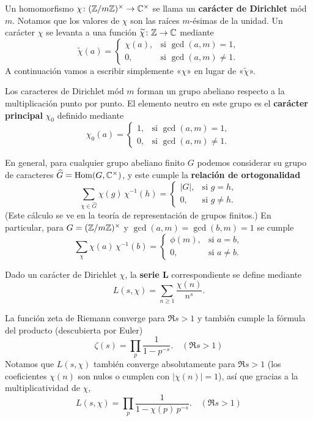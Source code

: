 Un homomorfismo $\chi\colon (\mathbb{Z}/m\mathbb{Z})^\times \to \mathbb{C}^\times$ se llama un
\textbf{carácter de Dirichlet} mód $m$. Notamos que los valores de $\chi$
son las raíces $m$-ésimas de la unidad. Un carácter $\chi$ se levanta a una
función $\widetilde{\chi}\colon \mathbb{Z} \to \mathbb{C}$ mediante
\[ \widetilde{\chi} (a) = \begin{cases}
  \chi (a), & \text{si }\gcd (a,m) = 1, \\
  0, & \text{si }\gcd (a,m) \ne 1.
\end{cases} \]
A continuación vamos a escribir simplemente «$\chi$» en lugar de
«$\widetilde{\chi}$».

Los caracteres de Dirichlet mód $m$ forman un grupo abeliano respecto a
la multiplicación punto por punto. El elemento neutro en este grupo es el
\textbf{carácter principal} $\chi_0$ definido mediante
\[ \chi_0 (a) = \begin{cases}
  1, & \text{si }\gcd (a,m) = 1,\\
  0, & \text{si }\gcd (a,m) \ne 1.
\end{cases} \]

En general, para cualquier grupo abeliano finito $G$ podemos considerar su grupo
de caracteres $\widehat{G} = \operatorname{Hom} (G, \mathbb{C}^\times)$, y este cumple la
\textbf{relación de ortogonalidad}
\[ \sum_{\chi \in \widehat{G}} \chi (g)\,\chi^{-1} (h) = \begin{cases}
    |G|, & \text{si }g = h,\\
    0, & \text{si }g \ne h.
\end{cases} \]
(Este cálculo se ve en la teoría de representación de grupos finitos.)
En particular, para $G = (\mathbb{Z}/m\mathbb{Z})^\times$ y $\gcd (a,m) = \gcd (b,m) = 1$ se
cumple
\begin{equation}
  \label{eqn:relacion-de-ortogonalidad}
  \sum_\chi \chi (a)\,\chi^{-1} (b) = \begin{cases}
    \phi (m), & \text{si }a = b,\\
    0, & \text{si }a \ne b.
  \end{cases}
\end{equation}

\begin{definicion}
  Dado un carácter de Dirichlet $\chi$, la \textbf{serie L} correspondiente
  se define mediante
  $$L (s,\chi) = \sum_{n\ge 1} \frac{\chi (n)}{n^s}.$$
\end{definicion}

La función zeta de Riemann converge para $\Re s > 1$ y también cumple la
fórmula del producto (descubierta por Euler)
$$\zeta (s) = \prod_p \frac{1}{1 - p^{-s}}. \quad (\Re s > 1)$$
Notamos que $L (s,\chi)$ también converge absolutamente para $\Re s > 1$
(los coeficientes $\chi (n)$ son nulos o cumplen con $|\chi (n)| = 1$),
así que gracias a la multiplicatividad de $\chi$,
$$L (s,\chi) = \prod_p \frac{1}{1 - \chi (p)\,p^{-s}}. \quad (\Re s > 1)$$

